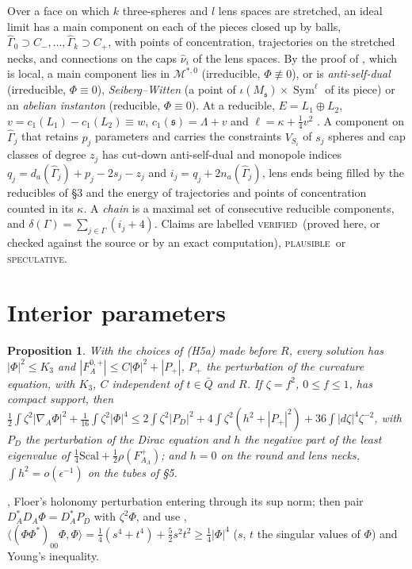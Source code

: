 \documentclass[10pt]{amsart}
\makeatletter
\numberwithin{equation}{section}
\theoremstyle{compact}
\newtheorem{proposition}[theorem]{Proposition}
\renewenvironment{proof}[1][\proofname]{\par\pushQED{\qed}\normalfont
  \topsep4\p@\relax\trivlist\item[\hskip\labelsep\itshape#1\@addpunct{.}]%
  \ignorespaces}{\popQED\endtrivlist\@endpefalse}
\newcommand{\Sym}{\operatorname{Sym}}
\newcommand{\fs}{\mathfrak s}
\newcommand{\cM}{\mathcal M}
\newcommand{\Ms}{\cM^{*,0}}
\newcommand{\ver}{\textsc{verified}}
\newcommand{\pla}{\textsc{plausible}}
\newcommand{\spe}{\textsc{speculative}}
\makeatother
\begin{document}
Over a face on which $k$ three-spheres and $l$ lens spaces are stretched, an
ideal limit \cite[Def.~4.19, Thm.~4.20]{FL1} has a main component on each of the
pieces closed up by balls, $\hat\Gamma_0\supset C_-,\dots,\hat\Gamma_k\supset
C_+$, with points of concentration, trajectories on the stretched necks, and
connections on the caps $\hat\nu_i$ of the lens spaces. By the proof of
\cite[Prop.~3.1]{FL2a}, which is local, a main component lies in $\Ms$
(irreducible, $\Phi\not\equiv0$), or is \emph{anti-self-dual} (irreducible,
$\Phi\equiv0$), \emph{Seiberg--Witten} (a point of $\iota(M_\fs)\times\Sym^\ell$
of its piece) or an \emph{abelian instanton} (reducible, $\Phi\equiv0$). At a
reducible, $E=L_1\oplus L_2$, $v=c_1(L_1)-c_1(L_2)\equiv w$, $c_1(\fs)=\Lambda+v$
and $\ell=\kappa+\frac14v^2$ \cite[Lemma~3.32, (3.64)]{FL2b}. A component on
$\hat\Gamma_j$ that retains $p_j$ parameters and carries the constraints
$V_{S_i}$ of $s_j$ spheres and cap classes of degree $z_j$ has cut-down
anti-self-dual and monopole indices $q_j=d_a(\hat\Gamma_j)+p_j-2s_j-z_j$ and
$i_j=q_j+2n_a(\hat\Gamma_j)$, lens ends being filled by the reducibles of \S3 and
the energy of trajectories and points of concentration counted in its $\kappa$.
A \emph{chain} is a maximal set of consecutive reducible components, and
$\delta(\Gamma)=\sum_{j\in\Gamma}(i_j+4)$. Claims are labelled \ver\ (proved
here, or checked against the source or by an exact computation), \pla\ or \spe.

\section{Interior parameters}

\begin{proposition}\label{prop:bounds}
With the choices of \textup{(H5a)} made before $R$, every solution has
$|\Phi|^2\le K_3$ and $|F^{0,+}_A|\le C|\Phi|^2+|P_+|$, $P_+$ the perturbation
of the curvature equation, with $K_3$, $C$ independent of $t\in\bar Q$ and $R$.
If $\zeta=f^2$, $0\le f\le1$, has compact support, then $\frac12\int\zeta^2
|\nabla_A\Phi|^2+\frac1{16}\int\zeta^2|\Phi|^4\le2\int\zeta^2|P_D|^2+4\int
\zeta^2(h^2+|P_+|^2)+36\int|d\zeta|^4\zeta^{-2}$, with $P_D$ the perturbation of
the Dirac equation and $h$ the negative part of the least eigenvalue of
$\frac14\mathrm{Scal}+\frac12\rho(F^+_{A_\Lambda})$; and $h=0$ on the round and
lens necks, $\int h^2=o(\epsilon^{-1})$ on the tubes of \S5.
\end{proposition}

\begin{proof}[Sketch]
\cite[Lemma~4.4, Rem.~4.6]{FL1}, Floer's holonomy perturbation entering through
its sup norm; then pair $D_A^*D_A\Phi=D_A^*P_D$ with $\zeta^2\Phi$, and use
\cite[Lemma~4.1]{FL1}, $\langle(\Phi\Phi^*)_{00}\Phi,\Phi\rangle=
\frac14(s^4+t^4)+\frac52s^2t^2\ge\frac14|\Phi|^4$ ($s$, $t$ the singular values
of $\Phi$) and Young's inequality.
\end{proof}
\end{document}
